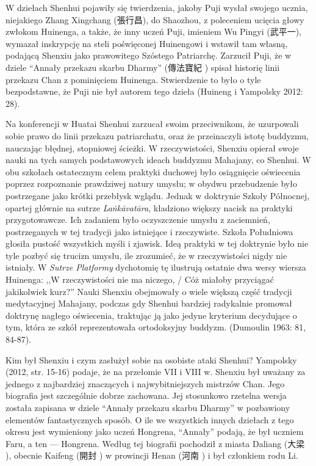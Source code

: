 W dziełach Shenhui pojawiły się twierdzenia, jakoby Puji wysłał swojego ucznia, niejakiego Zhang Xingchang (張行昌), do Shaozhou, z poleceniem ucięcia głowy zwłokom Huinenga, a także, że inny uczeń Puji, imieniem Wu Pingyi (武平一), wymazał inskrypcję na steli poświęconej Huinengowi i wstawił tam własną, podającą Shenxiu jako prawowitego Szóstego Patriarchę.
Zarzucił Puji, że w dziele ``Annały przekazu skarbu Dharmy'' (傳法寶紀 ) spisał historię linii przekazu Chan z pominięciem Huinenga.
Stwierdzenie to było o tyle bezpodstawne, że Puji nie był autorem tego dzieła
(Huineng i Yampolsky 2012: 28).

Na konferencji w Huatai Shenhui zarzucał swoim przeciwnikom, że uzurpowali sobie prawo do linii przekazu patriarchatu, oraz że przeinaczyli istotę buddyzmu, nauczając błędnej, stopniowej ścieżki.
W rzeczywistości, Shenxiu opierał swoje nauki na tych samych podstawowych ideach buddyzmu Mahajany, co Shenhui.
W obu szkołach ostatecznym celem praktyki duchowej było osiągnięcie oświecenia poprzez rozpoznanie prawdziwej natury umysłu; w obydwu przebudzenie było postrzegane jako krótki przebłysk wglądu.
Jednak w doktrynie Szkoły Północnej, opartej głównie na sutrze \textit{La\.nkā\-vatāra}, kładziono większy nacisk na praktyki przygotowawcze.
Ich zadaniem było oczyszczenie umysłu z zaciemnień, postrzeganych w tej tradycji jako istniejące i rzeczywiste.
Szkoła Południowa głosiła pustość wszystkich myśli i zjawisk.
Ideą praktyki w tej doktrynie było nie tyle pozbyć się trucizn umysłu, ile zrozumieć, że w rzeczywistości nigdy nie istniały.
W \textit{Sutrze Platformy} dychotomię tę ilustrują ostatnie dwa wersy wiersza Huinenga: ,,W rzeczywistości nie ma niczego, / Cóż miałoby przyciągać jakikolwiek kurz?'' %
Nauki Shenxiu obejmowały o wiele większą część tradycji medytacyjnej Mahajany, podczas gdy Shenhui bardziej radykalnie promował doktrynę nagłego oświecenia, traktując ją jako jedyne kryterium decydujące o tym, która ze szkół reprezentowała ortodoksyjny buddyzm.
(Dumoulin 1963: 81, 84-87). %

Kim był Shenxiu i czym zasłużył sobie na osobiste ataki Shenhui? Yampolsky (2012, str. 15-16) podaje, że na przełomie VII i VIII w. Shenxiu był uważany za jednego z najbardziej znaczących i najwybitniejszych mistrzów Chan.
Jego biografia jest szczególnie dobrze zachowana. Jej stosunkowo rzetelna wersja została zapisana w dziele ``Annały przekazu skarbu Dharmy'' w pozbawiony elementów fantastycznych sposób. O ile we wszystkich innych dziełach z tego okresu jest wymieniony jako uczeń Hongrena, ``Annały'' podają, że był uczniem Faru, a ten --- Hongrena. Według tej biografii pochodził z miasta Daliang (大梁 ), obecnie Kaifeng (開封 ) w prowincji Henan (河南 ) i był członkiem rodu Li.

